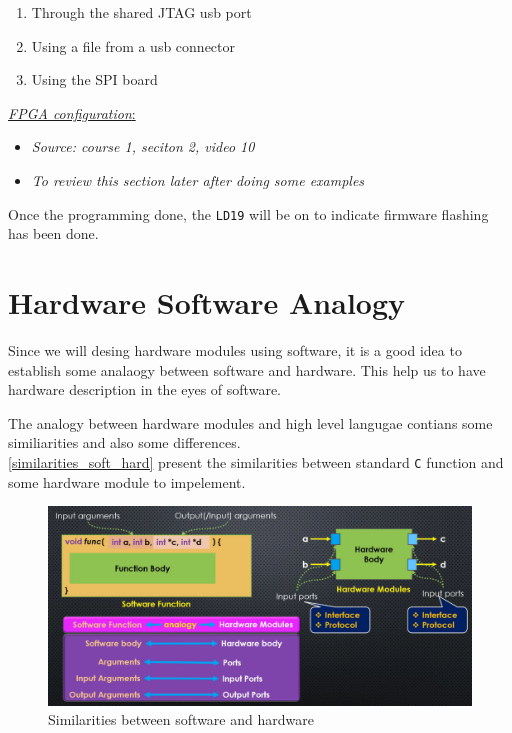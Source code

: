 \begin{enumerate}

\item Through the shared JTAG usb port

\item Using a file from a usb connector

\item Using the SPI board

\end{enumerate}

\underline{\textit{FPGA configuration}:} 

\begin{itemize}

\item \textit{Source: course 1, seciton 2, video 10}

\item \textit{To review this section later after doing some examples}

\end{itemize}

Once the programming done, the \verb|LD19| will be on to indicate firmware flashing has been done.
 
\newpage
\section{Hardware Software Analogy}

Since we will desing hardware modules using software, it is a good idea to establish some analaogy between software and hardware. This help us to have hardware description in the eyes of software.

The analogy between hardware modules and high level langugae contians some similiarities and also some differences.\\


\autoref{similarities_soft_hard} present the similarities between standard \verb|C| function and some hardware module to impelement.

\begin{figure}[h]
\centering
\includegraphics[scale=0.35,frame]{Figures/intro_hls/similarities_soft_hard}
\caption{Similarities between software and hardware}
\label{fig:intro_hls:similarities_soft_hard}
\end{figure}

